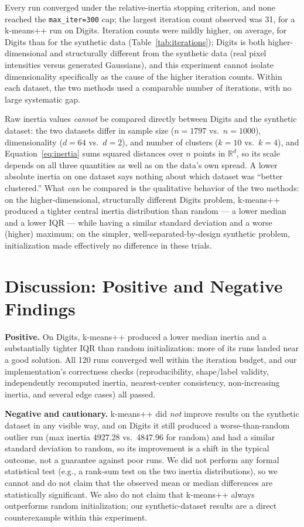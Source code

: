 \documentclass[a4paper,11pt]{article}
\begin{document}
Every run converged under the relative-inertia stopping criterion, and none reached the
\texttt{max\_iter=300} cap; the largest iteration count observed was 31, for a k-means++ run
on Digits. Iteration counts were mildly higher, on average, for Digits than for the synthetic
data (Table~\ref{tab:iterations}); Digits is both higher-dimensional and structurally different
from the synthetic data (real pixel intensities versus generated Gaussians), and this
experiment cannot isolate dimensionality specifically as the cause of the higher iteration
counts. Within each dataset, the two methods used a comparable number of iterations, with
no large systematic gap.

Raw inertia values \emph{cannot} be compared directly between Digits and the synthetic
dataset: the two datasets differ in sample size ($n=1797$ vs.\ $n=1000$), dimensionality
($d=64$ vs.\ $d=2$), and number of clusters ($k=10$ vs.\ $k=4$), and Equation~\eqref{eq:inertia}
sums squared distances over $n$ points in $\mathbb{R}^d$, so its scale depends on all three
quantities as well as on the data's own spread. A lower absolute inertia on one dataset says
nothing about which dataset was ``better clustered.'' What \emph{can} be compared is the
qualitative behavior of the two methods: on the higher-dimensional, structurally different
Digits problem, k-means++ produced a tighter central inertia distribution than random --- a
lower median and a lower IQR --- while having a similar standard deviation and a worse
(higher) maximum; on the simpler, well-separated-by-design synthetic problem, initialization
made effectively no difference in these trials.

\section{Discussion: Positive and Negative Findings}
\label{sec:discussion}

\textbf{Positive.} On Digits, k-means++ produced a lower median inertia and a substantially
tighter IQR than random initialization: more of its runs landed near a good solution. All 120
runs converged well within the iteration budget, and our implementation's correctness checks
(reproducibility, shape/label validity, independently recomputed inertia, nearest-center
consistency, non-increasing inertia, and several edge cases) all passed.

\textbf{Negative and cautionary.} k-means++ did \emph{not} improve results on the synthetic
dataset in any visible way, and on Digits it still produced a worse-than-random outlier run
(max inertia 4927.28 vs.\ 4847.96 for random) and had a similar standard deviation to random,
so its improvement is a shift in the typical outcome, not a guarantee against poor runs. We
did not perform any formal statistical test (e.g., a rank-sum test on the two inertia
distributions), so we cannot and do not claim that the observed mean or median differences
are statistically significant. We also do not claim that k-means++ always outperforms random
initialization; our synthetic-dataset results are a direct counterexample within this
experiment.
\end{document}
